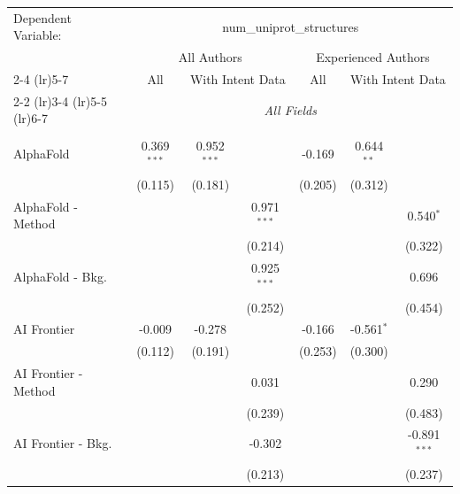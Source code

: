 \begingroup
\centering
\begin{tabular}{lcccccc}
   \tabularnewline \midrule \midrule
   Dependent Variable: & \multicolumn{6}{c}{num\_uniprot\_structures}\\
 & \multicolumn{3}{c}{All Authors} & \multicolumn{3}{c}{Experienced Authors} \\
\cmidrule(lr){2-4} \cmidrule(lr){5-7}
 & \multicolumn{1}{c}{All} & \multicolumn{2}{c}{With Intent Data} & \multicolumn{1}{c}{All} & \multicolumn{2}{c}{With Intent Data} \\
\cmidrule(lr){2-2} \cmidrule(lr){3-4} \cmidrule(lr){5-5} \cmidrule(lr){6-7}
 & \multicolumn{6}{c}{\textit{All Fields}} \\ \\
   AlphaFold            & 0.369$^{***}$ & 0.952$^{***}$ &               & -0.169       & 0.644$^{**}$ &   \\   
                        & (0.115)       & (0.181)       &               & (0.205)      & (0.312)      &   \\   
   AlphaFold - Method   &               &               & 0.971$^{***}$ &              &              & 0.540$^{*}$\\   
                        &               &               & (0.214)       &              &              & (0.322)\\   
   AlphaFold - Bkg.     &               &               & 0.925$^{***}$ &              &              & 0.696\\   
                        &               &               & (0.252)       &              &              & (0.454)\\   
   AI Frontier          & -0.009        & -0.278        &               & -0.166       & -0.561$^{*}$ &   \\   
                        & (0.112)       & (0.191)       &               & (0.253)      & (0.300)      &   \\   
   AI Frontier - Method &               &               & 0.031         &              &              & 0.290\\   
                        &               &               & (0.239)       &              &              & (0.483)\\   
   AI Frontier - Bkg.   &               &               & -0.302        &              &              & -0.891$^{***}$\\   
                        &               &               & (0.213)       &              &              & (0.237)\\   

\end{tabular}

